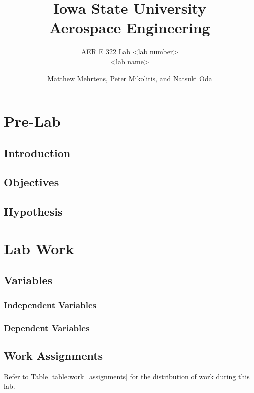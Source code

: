 \documentclass[12 pt]{report}
\title{\textbf{Iowa State University
\\{\Large Aerospace Engineering}}}
\subtitle{AER E 322 Lab <lab number>\\
		  <lab name>}
\author{Matthew Mehrtens, Peter Mikolitis, and Natsuki Oda}
\begin{document}
\maketitle
\tableofcontents

\chapter{Pre-Lab} \label{pre-lab}
\section{Introduction} \label{introduction}

\section{Objectives} \label{objectives}

\section{Hypothesis} \label{hypothesis}

\chapter{Lab Work} \label{lab_work}
\section{Variables} \label{variables}
\subsection{Independent Variables} \label{variables-independent_variables}

\subsection{Dependent Variables} \label{variables-dependent_variables}

\section{Work Assignments} \label{work_assignments}
Refer to Table \ref{table:work_assignments} for the distribution of work during this lab.
\end{document}
